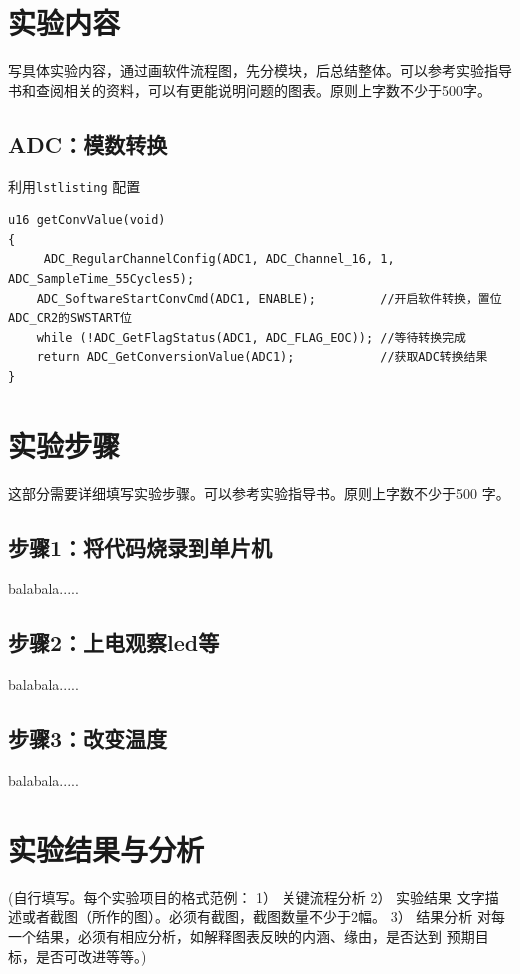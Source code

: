 \documentclass[12pt,hyperref,a4paper,twoside,UTF8]{ctexart}
\begin{document}
\section{实验内容}

写具体实验内容，通过画软件流程图，先分模块，后总结整体。可以参考实验指导书和查阅相关的资料，可以有更能说明问题的图表。原则上字数不少于500字。

\subsection{ADC：模数转换}
利用\verb|lstlisting| 配置

\begin{lstlisting}[style=CPP, title="ADC关键代码"]
u16 getConvValue(void)
{
     ADC_RegularChannelConfig(ADC1, ADC_Channel_16, 1, ADC_SampleTime_55Cycles5);
	ADC_SoftwareStartConvCmd(ADC1, ENABLE);         //开启软件转换，置位ADC_CR2的SWSTART位
    while (!ADC_GetFlagStatus(ADC1, ADC_FLAG_EOC)); //等待转换完成
    return ADC_GetConversionValue(ADC1);            //获取ADC转换结果
}
\end{lstlisting}


\section{实验步骤}


这部分需要详细填写实验步骤。可以参考实验指导书。原则上字数不少于500
字。
\subsection{步骤1：将代码烧录到单片机}

balabala.....

\subsection{步骤2：上电观察led等}

balabala.....

\subsection{步骤3：改变温度}

balabala.....







\section{实验结果与分析}
 (自行填写。每个实验项目的格式范例：
1） 关键流程分析
2） 实验结果
文字描述或者截图（所作的图）。必须有截图，截图数量不少于2幅。
3） 结果分析
对每一个结果，必须有相应分析，如解释图表反映的内涵、缘由，是否达到
预期目标，是否可改进等等。)
\end{document}
